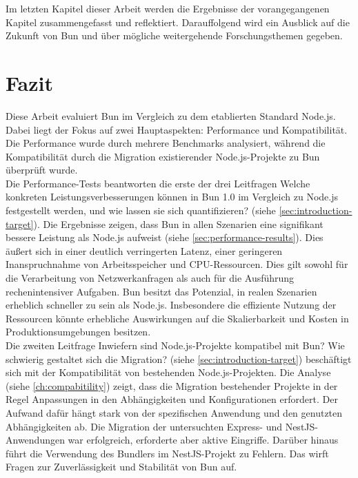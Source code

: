  \label{ch:finalThoughts}
Im letzten Kapitel dieser Arbeit werden die Ergebnisse der vorangegangenen Kapitel zusammengefasst und reflektiert. Darauffolgend wird ein Ausblick auf die Zukunft von Bun und über mögliche weitergehende Forschungsthemen gegeben.

\section{Fazit} \label{sec:finalThoughts-conclusion}
Diese Arbeit evaluiert Bun im Vergleich zu dem etablierten Standard Node.js. Dabei liegt der Fokus auf zwei Hauptaspekten: Performance und Kompatibilität. Die Performance wurde durch mehrere Benchmarks analysiert, während die Kompatibilität durch die Migration existierender Node.js-Projekte zu Bun überprüft wurde.\\

\noindent
Die Performance-Tests beantworten die erste der drei Leitfragen \glqq Welche konkreten Leistungsverbesserungen können in Bun 1.0 im Vergleich zu Node.js festgestellt werden, und wie lassen sie sich quantifizieren?\grqq{} (siehe \autoref{sec:introduction-target}). Die Ergebnisse zeigen, dass Bun in allen Szenarien eine signifikant bessere Leistung als Node.js aufweist (siehe \autoref{sec:performance-results}). Dies äußert sich in einer deutlich verringerten Latenz, einer geringeren Inanspruchnahme von Arbeitsspeicher und CPU-Ressourcen. Dies gilt sowohl für die Verarbeitung von Netzwerkanfragen als auch für die Ausführung rechenintensiver Aufgaben. Bun besitzt das Potenzial, in realen Szenarien erheblich schneller zu sein als Node.js. Insbesondere die effiziente Nutzung der Ressourcen könnte erhebliche Auswirkungen auf die Skalierbarkeit und Kosten in Produktionsumgebungen besitzen.\\

\noindent
Die zweiten Leitfrage  \glqq Inwiefern sind Node.js-Projekte kompatibel mit Bun? Wie schwierig gestaltet sich die Migration?\grqq{} (siehe \autoref{sec:introduction-target}) beschäftigt sich mit der Kompatibilität von bestehenden Node.js-Projekten. Die Analyse (siehe \autoref{ch:compabitility}) zeigt, dass die Migration bestehender Projekte in der Regel Anpassungen in den Abhängigkeiten und Konfigurationen erfordert. Der Aufwand dafür hängt stark von der spezifischen Anwendung und den genutzten Abhängigkeiten ab. Die Migration der untersuchten Express- und NestJS-Anwendungen war erfolgreich, erforderte aber aktive Eingriffe. Darüber hinaus führt die Verwendung des Bundlers im NestJS-Projekt zu Fehlern. Das wirft Fragen zur Zuverlässigkeit und Stabilität von Bun auf.\\

